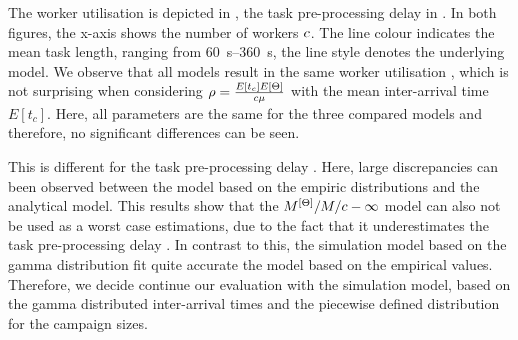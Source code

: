 The worker utilisation \workerUtilization is depicted in , the task pre-processing delay \preTaskProcessingDelay in .
In both figures, the x-axis shows the number of workers \(c\).
The line colour indicates the mean task length, ranging from \SIrange{60}{360}{\second}, the line style denotes the underlying model.
We observe that all models result in the same worker utilisation \workerUtilization, which is not surprising when considering \(\rho = \frac{E[t_c] E[\Theta]}{c\mu}\) with the mean inter-arrival time \(E[t_c]\).
Here, all parameters are the same for the three compared models and therefore, no significant differences can be seen.

This is different for the task pre-processing delay \preTaskProcessingDelay. 
Here, large discrepancies can been observed between the model based on the empiric distributions and the analytical model.
This results show that the \(M^{[\Theta]}/M/c-\infty\) model can also not be used as a worst case estimations, due to the fact that it underestimates the task pre-processing delay \preTaskProcessingDelay.
In contrast to this, the simulation model based on the gamma distribution fit quite accurate the model based on the empirical values.
Therefore, we decide continue our evaluation with the simulation model, based on the gamma distributed inter-arrival times and the piecewise defined distribution for the campaign sizes.
